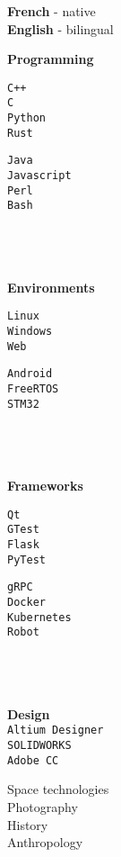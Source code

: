 \documentclass[9pt]{developercv} %
\begin{document}
\begin{minipage}[t]{0.18\textwidth}
		\textbf{French} - native\\
		\textbf{English} - bilingual

		\textbf{Programming}\\
		\begin{minipage}[t]{0.5\textwidth}
			\texttt{C++}\\
			\texttt{C}\\
			\texttt{Python}\\
			\texttt{Rust}
		\end{minipage}
		\begin{minipage}[t]{0.48\textwidth}
			\texttt{Java}\\
			\texttt{Javascript}\\
			\texttt{Perl}\\
			\texttt{Bash}
		\end{minipage}
		\\\\\\
		\textbf{Environments}\\
		\begin{minipage}[t]{0.5\textwidth}
			\texttt{Linux}\\
			\texttt{Windows}\\
			\texttt{Web}
		\end{minipage}
		\begin{minipage}[t]{0.48\textwidth}
			\texttt{Android}\\
			\texttt{FreeRTOS}\\
			\texttt{STM32}
		\end{minipage}
		\\\\\\
		\textbf{Frameworks}\\
		\begin{minipage}[t]{0.5\textwidth}
			\texttt{Qt}\\
			\texttt{GTest}\\
			\texttt{Flask}\\
			\texttt{PyTest}
		\end{minipage}
		\begin{minipage}[t]{0.48\textwidth}
			\texttt{gRPC}\\
			\texttt{Docker}\\
			\texttt{Kubernetes}\\
			\texttt{Robot}
		\end{minipage}
		\\\\\\
		\textbf{Design}\\
		\texttt{Altium Designer}\\
		\texttt{SOLIDWORKS}\\
		\texttt{Adobe CC}

		Space technologies\\
		Photography\\
		History\\
		Anthropology
\end{minipage}

\end{document}
